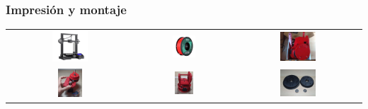 \documentclass{beamer}
\begin{document}
\begin{frame}
  \frametitle{Impresión y montaje}
  \begin{table}[htbp]
    \centering
    \begin{tabular}{ccc}
        \includegraphics[width=0.3\textwidth, valign=m]{figs/ender3.png} & \includegraphics[width=0.25\textwidth, valign=m]{figs/pla.jpg} 
         & \includegraphics[width=0.3\textwidth, valign=m]{figs/montaje2.jpeg} \\
         \includegraphics[width=0.2\textwidth, valign=m]{figs/montaje.png} & \includegraphics[width=0.2\textwidth, valign=m]{figs/montaje1.png} 
         & \includegraphics[width=0.3\textwidth, valign=m]{figs/montaje3.jpeg}
        
    \end{tabular}
  \end{table}
\end{frame}
\end{document}
